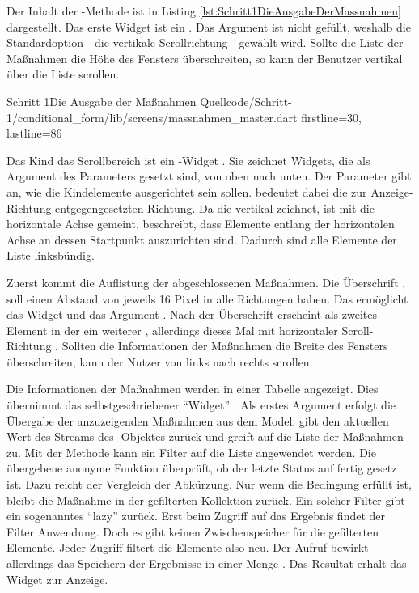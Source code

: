 Der Inhalt der -Methode ist in Listing \ref{lst:Schritt1DieAusgabeDerMassnahmen} dargestellt.
Das erste Widget ist ein  .
Das Argument  ist nicht gefüllt, weshalb die Standardoption - die vertikale Scrollrichtung - gewählt wird.
Sollte die Liste der Maßnahmen die Höhe des Fensters überschreiten, so kann der Benutzer vertikal über die Liste scrollen.

\begin{alexlisting}{Schritt 1}{Die Ausgabe der Maßnahmen}
  {Quellcode/Schritt-1/conditional_form/lib/screens/massnahmen_master.dart}
  {firstline=30, lastline=86}
  \label{lst:Schritt1DieAusgabeDerMassnahmen}
\end{alexlisting}

Das Kind das Scrollbereich ist ein -Widget .
Sie zeichnet Widgets, die als Argument des Parameters  gesetzt sind, von oben nach unten.
Der Parameter  gibt an, wie die Kindelemente ausgerichtet sein sollen.  bedeutet dabei die zur Anzeige-Richtung entgegengesetzten Richtung. Da die  vertikal zeichnet, ist mit  die horizontale Achse gemeint.  beschreibt, dass Elemente entlang der horizontalen Achse an dessen Startpunkt auszurichten sind. Dadurch sind alle Elemente der Liste linksbündig.

Zuerst kommt die Auflistung der abgeschlossenen Maßnahmen.
Die Überschrift  , soll einen Abstand von jeweils 16 Pixel in alle Richtungen haben.
Das ermöglicht das Widget   und das Argument . Nach der Überschrift erscheint als zweites Element in der  ein weiterer  , allerdings dieses Mal mit horizontaler Scroll-Richtung . Sollten die Informationen der Maßnahmen die Breite des Fensters überschreiten, kann der Nutzer von links nach rechts scrollen.

Die Informationen der Maßnahmen werden in einer Tabelle angezeigt.
Dies übernimmt das selbstgeschriebener \enquote{Widget}  .
Als erstes Argument erfolgt die Übergabe der anzuzeigenden Maßnahmen aus dem Model.  gibt den aktuellen Wert des Streams des -Objektes zurück und greift auf die Liste der Maßnahmen zu. Mit der Methode   kann ein Filter auf die Liste angewendet werden. Die übergebene anonyme Funktion    überprüft, ob der letzte Status auf fertig gesetz ist. Dazu reicht der Vergleich der Abkürzung. Nur wenn die Bedingung erfüllt ist, bleibt die Maßnahme in der gefilterten Kollektion zurück. Ein solcher Filter gibt ein sogenanntes \enquote{lazy}  zurück. Erst beim Zugriff auf das Ergebnis findet der Filter Anwendung. Doch es gibt keinen Zwischenspeicher für die gefilterten Elemente. Jeder Zugriff filtert die Elemente also neu. Der Aufruf  bewirkt allerdings das Speichern der Ergebnisse in einer Menge . Das Resultat erhält das Widget  zur Anzeige.

